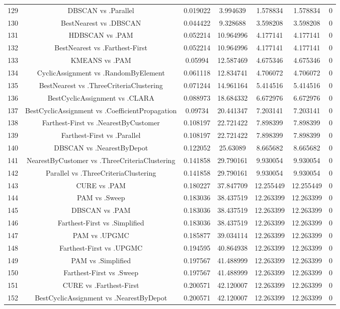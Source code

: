 \documentclass[a4paper,10pt]{article}
\begin{document}
\begin{landscape}
\begin{table}[!htp]
\begin{tabular}{ccccccc}
129&DBSCAN vs .Parallel&0.019022&3.994639&1.578834&1.578834&0\\
130&BestNearest vs .DBSCAN&0.044422&9.328688&3.598208&3.598208&0\\
131&HDBSCAN vs .PAM&0.052214&10.964996&4.177141&4.177141&0\\
132&BestNearest vs .Farthest-First&0.052214&10.964996&4.177141&4.177141&0\\
133&KMEANS vs .PAM&0.05994&12.587469&4.675346&4.675346&0\\
134&CyclicAssignment vs .RandomByElement&0.061118&12.834741&4.706072&4.706072&0\\
135&BestNearest vs .ThreeCriteriaClustering&0.071244&14.961164&5.414516&5.414516&0\\
136&BestCyclicAssignment vs .CLARA&0.088973&18.684332&6.672976&6.672976&0\\
137&BestCyclicAssignment vs .CoefficientPropagation&0.09734&20.441347&7.203141&7.203141&0\\
138&Farthest-First vs .NearestByCustomer&0.108197&22.721422&7.898399&7.898399&0\\
139&Farthest-First vs .Parallel&0.108197&22.721422&7.898399&7.898399&0\\
140&DBSCAN vs .NearestByDepot&0.122052&25.63089&8.665682&8.665682&0\\
141&NearestByCustomer vs .ThreeCriteriaClustering&0.141858&29.790161&9.930054&9.930054&0\\
142&Parallel vs .ThreeCriteriaClustering&0.141858&29.790161&9.930054&9.930054&0\\
143&CURE vs .PAM&0.180227&37.847709&12.255449&12.255449&0\\
144&PAM vs .Sweep&0.183036&38.437519&12.263399&12.263399&0\\
145&DBSCAN vs .PAM&0.183036&38.437519&12.263399&12.263399&0\\
146&Farthest-First vs .Simplified&0.183036&38.437519&12.263399&12.263399&0\\
147&PAM vs .UPGMC&0.185877&39.034114&12.263399&12.263399&0\\
148&Farthest-First vs .UPGMC&0.194595&40.864938&12.263399&12.263399&0\\
149&PAM vs .Simplified&0.197567&41.488999&12.263399&12.263399&0\\
150&Farthest-First vs .Sweep&0.197567&41.488999&12.263399&12.263399&0\\
151&CURE vs .Farthest-First&0.200571&42.120007&12.263399&12.263399&0\\
152&BestCyclicAssignment vs .NearestByDepot&0.200571&42.120007&12.263399&12.263399&0\\

\end{tabular}
\end{table}
\end{landscape}
\end{document}
